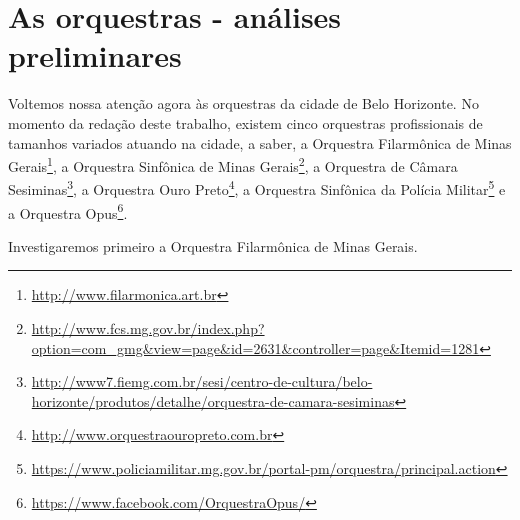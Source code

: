 \documentclass[a4paper, 12pt, openright, oneside, german, french, english, brazil]{abntex2}
\begin{document}
	\chapter{As orquestras - análises preliminares}






	Voltemos nossa atenção agora às orquestras da cidade de Belo Horizonte. No momento da redação deste trabalho, existem cinco orquestras profissionais de tamanhos variados atuando na cidade, a saber, a Orquestra Filarmônica de Minas Gerais\footnote{\url{http://www.filarmonica.art.br}}, a Orquestra Sinfônica de Minas Gerais\footnote{\url{http://www.fcs.mg.gov.br/index.php?option=com_gmg&view=page&id=2631&controller=page&Itemid=1281}}, a Orquestra de Câmara Sesiminas\footnote{\url{http://www7.fiemg.com.br/sesi/centro-de-cultura/belo-horizonte/produtos/detalhe/orquestra-de-camara-sesiminas}}, a Orquestra Ouro Preto\footnote{\url{http://www.orquestraouropreto.com.br}}, a Orquestra Sinfônica da Polícia Militar\footnote{\url{https://www.policiamilitar.mg.gov.br/portal-pm/orquestra/principal.action}} e a Orquestra Opus\footnote{\url{https://www.facebook.com/OrquestraOpus/}}.



	Investigaremos primeiro a Orquestra Filarmônica de Minas Gerais.
\end{document}
